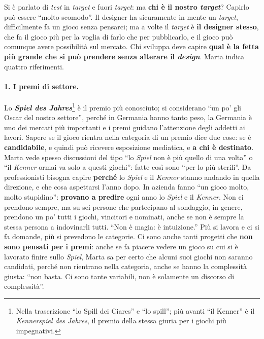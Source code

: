 

Si è parlato di \emph{test} in \emph{target} e fuori \emph{target}: ma \textbf{chi è il
nostro \emph{target}}? Capirlo può essere ``molto scomodo''. Il designer ha sicuramente in
mente un \emph{target}, difficilmente fa un gioco senza pensarci; ma a volte il
\emph{target} è \textbf{il designer stesso}, che fa il gioco più per la voglia di farlo che
per pubblicarlo, e il gioco può comunque avere possibilità sul mercato. Chi sviluppa deve
capire \textbf{qual è la fetta più grande che si può prendere senza alterare il
\emph{design}}. Marta indica quattro riferimenti.

\paragraph{1. I premi di settore.} Lo \textbf{\emph{Spiel des Jahres}}\footnote{Nella
trascrizione ``lo Spill dei Ciares'' e ``lo spill''; più avanti ``il Kenner'' è il
\emph{Kennerspiel des Jahres}, il premio della stessa giuria per i giochi più impegnativi.}
è il premio più conosciuto; si considerano ``un po' gli Oscar del nostro settore'', perché
in Germania hanno tanto peso, la Germania è uno dei mercati più importanti e i premi
guidano l'attenzione degli addetti ai lavori. Sapere se il gioco rientra nella categoria di
un premio dice due cose: se è \textbf{candidabile}, e quindi può ricevere esposizione
mediatica, e \textbf{a chi è destinato}. Marta vede spesso discussioni del tipo ``lo
\emph{Spiel} non è più quello di una volta'' o ``il \emph{Kenner} ormai va solo a questi
giochi'': fatte così sono ``per lo più sterili''. Da professionisti bisogna capire
\textbf{perché} lo \emph{Spiel} e il \emph{Kenner} stanno andando in quella direzione, e
che cosa aspettarsi l'anno dopo. In azienda fanno ``un gioco molto, molto stupidino'':
\textbf{provano a predire} ogni anno lo \emph{Spiel} e il \emph{Kenner}. Non ci prendono
sempre, ma su sei persone che partecipano al sondaggio, in genere, prendono un po' tutti i
giochi, vincitori e nominati, anche se non è sempre la stessa persona a indovinarli tutti.
``Non è magia: è intuizione.'' Più si lavora e ci si fa domande, più si prevedono le
categorie. Ci sono anche tanti progetti che \textbf{non sono pensati per i premi}: anche se fa
piacere vedere un gioco su cui si è lavorato finire sullo \emph{Spiel}, Marta sa per certo
che alcuni suoi giochi non saranno candidati, perché non rientrano nella categoria, anche se
hanno la complessità giusta: ``non basta. Ci sono tante variabili, non è solamente un
discorso di complessità''.

